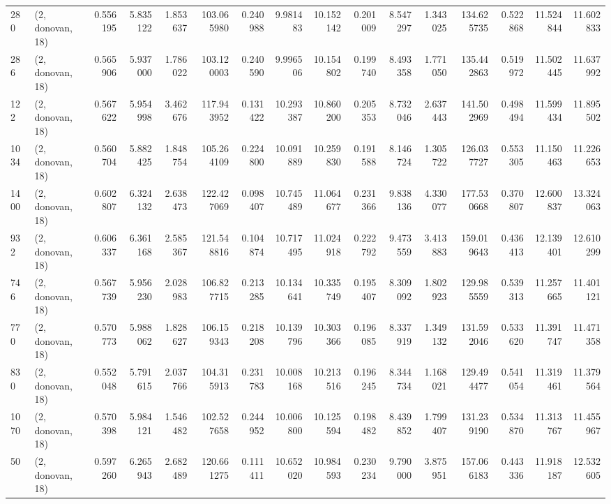 \begin{tabular}{llrrrrrrrrrrrrrr}
280  &  (2, donovan, 18) &   0.556195 &   5.835122 &   1.853637 &    103.065980 &    0.240988 &    9.981483 &   10.152142 &  0.201009 &   8.547297 &   1.343025 &   134.625735 &   0.522868 &  11.524844 &  11.602833 \\
286  &  (2, donovan, 18) &   0.565906 &   5.937000 &   1.786022 &    103.120003 &    0.240590 &    9.996506 &   10.154802 &  0.199740 &   8.493358 &   1.771050 &   135.442863 &   0.519972 &  11.502445 &  11.637992 \\
122  &  (2, donovan, 18) &   0.567622 &   5.954998 &   3.462676 &    117.943952 &    0.131422 &   10.293387 &   10.860200 &  0.205353 &   8.732046 &   2.637443 &   141.502969 &   0.498494 &  11.599434 &  11.895502 \\
1034 &  (2, donovan, 18) &   0.560704 &   5.882425 &   1.848754 &    105.264109 &    0.224800 &   10.091889 &   10.259830 &  0.191588 &   8.146724 &   1.305722 &   126.037727 &   0.553305 &  11.150463 &  11.226653 \\
1400 &  (2, donovan, 18) &   0.602807 &   6.324132 &   2.638473 &    122.427069 &    0.098407 &   10.745489 &   11.064677 &  0.231366 &   9.838136 &   4.330077 &   177.530668 &   0.370807 &  12.600837 &  13.324063 \\
932  &  (2, donovan, 18) &   0.606337 &   6.361168 &   2.585367 &    121.548816 &    0.104874 &   10.717495 &   11.024918 &  0.222792 &   9.473559 &   3.413883 &   159.019643 &   0.436413 &  12.139401 &  12.610299 \\
746  &  (2, donovan, 18) &   0.567739 &   5.956230 &   2.028983 &    106.827715 &    0.213285 &   10.134641 &   10.335749 &  0.195407 &   8.309092 &   1.802923 &   129.985559 &   0.539313 &  11.257665 &  11.401121 \\
770  &  (2, donovan, 18) &   0.570773 &   5.988062 &   1.828627 &    106.159343 &    0.218208 &   10.139796 &   10.303366 &  0.196085 &   8.337919 &   1.349132 &   131.592046 &   0.533620 &  11.391747 &  11.471358 \\
830  &  (2, donovan, 18) &   0.552048 &   5.791615 &   2.037766 &    104.315913 &    0.231783 &   10.008168 &   10.213516 &  0.196245 &   8.344734 &   1.168021 &   129.494477 &   0.541054 &  11.319461 &  11.379564 \\
1070 &  (2, donovan, 18) &   0.570398 &   5.984121 &   1.546482 &    102.527658 &    0.244952 &   10.006800 &   10.125594 &  0.198482 &   8.439852 &   1.799407 &   131.239190 &   0.534870 &  11.313767 &  11.455967 \\
50   &  (2, donovan, 18) &   0.597260 &   6.265943 &   2.682489 &    120.661275 &    0.111411 &   10.652020 &   10.984593 &  0.230234 &   9.790000 &   3.875951 &   157.066183 &   0.443336 &  11.918187 &  12.532605 \\

\end{tabular}
